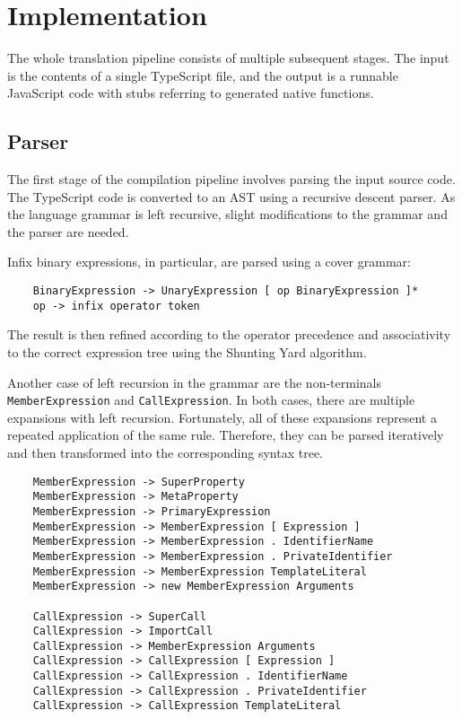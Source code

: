 \chapter{Implementation}

The whole translation pipeline consists of multiple subsequent stages. The input is the contents of a single TypeScript file, and the output is a runnable JavaScript code with stubs referring to generated native functions.


\section{Parser}

The first stage of the compilation pipeline involves parsing the input source code. The TypeScript code is converted to an AST using a recursive descent parser. As the language grammar is left recursive, slight modifications to the grammar and the parser are needed.

Infix binary expressions, in particular, are parsed using a cover grammar:

\begin{verbatim}
    BinaryExpression -> UnaryExpression [ op BinaryExpression ]*
    op -> infix operator token
\end{verbatim}

The result is then refined according to the operator precedence and associativity to the correct expression tree using the Shunting Yard algorithm. \todo{}

Another case of left recursion in the grammar are the non-terminals \texttt{MemberExpression} and \texttt{CallExpression}. In both cases, there are multiple expansions with left recursion. Fortunately, all of these expansions represent a repeated application of the same rule. Therefore, they can be parsed iteratively and then transformed into the corresponding syntax tree.

\begin{verbatim}
    MemberExpression -> SuperProperty
    MemberExpression -> MetaProperty
    MemberExpression -> PrimaryExpression
    MemberExpression -> MemberExpression [ Expression ]
    MemberExpression -> MemberExpression . IdentifierName
    MemberExpression -> MemberExpression . PrivateIdentifier
    MemberExpression -> MemberExpression TemplateLiteral
    MemberExpression -> new MemberExpression Arguments

    CallExpression -> SuperCall
    CallExpression -> ImportCall
    CallExpression -> MemberExpression Arguments
    CallExpression -> CallExpression [ Expression ]
    CallExpression -> CallExpression . IdentifierName
    CallExpression -> CallExpression . PrivateIdentifier
    CallExpression -> CallExpression TemplateLiteral
\end{verbatim}

